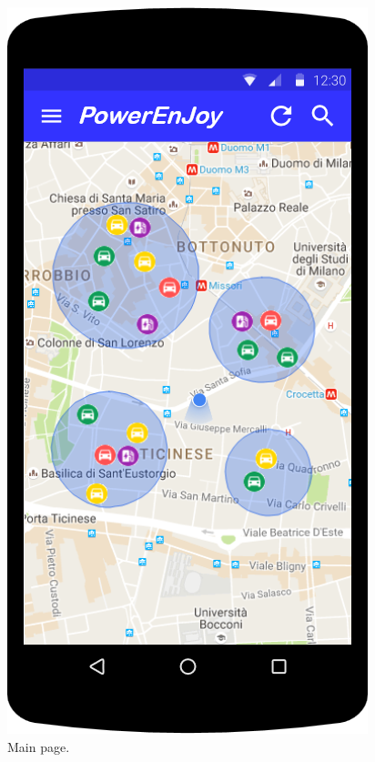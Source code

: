 \begin{figure}
	\centering
	\includegraphics[width=\textwidth,height=\dimexpr\textheight-4\baselineskip-\abovecaptionskip-\belowcaptionskip\relax,keepaspectratio]{overall_description/mockup/main_page.png}
	\caption{Main page.}
	\label{fig:mockup_main_page}
\end{figure}

